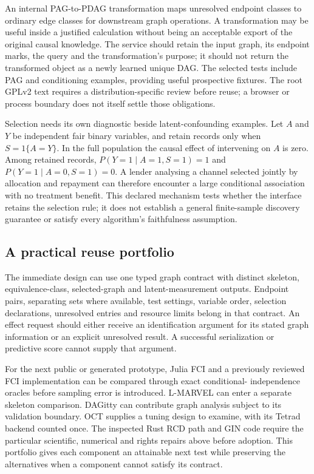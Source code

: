 An internal PAG-to-PDAG transformation maps unresolved endpoint classes
to ordinary edge classes for downstream graph operations. A
transformation may be useful inside a justified calculation without
being an acceptable export of the original causal knowledge. The service
should retain the input graph, its endpoint marks, the query and the
transformation's purpose; it should not return the transformed object as
a newly learned unique DAG. The selected tests include PAG and
conditioning examples, providing useful prospective fixtures. The root
GPLv2 text requires a distribution-specific review before reuse; a
browser or process boundary does not itself settle those obligations.
\citep{exec14_olatent_dagitty}

Selection needs its own diagnostic beside latent-confounding examples.
Let \(A\) and \(Y\) be independent fair binary variables, and retain
records only when \(S=1\{A=Y\}\). In the full population the causal
effect of intervening on \(A\) is zero. Among retained records,
\(P(Y=1\mid A=1,S=1)=1\) and \(P(Y=1\mid A=0,S=1)=0\). A lender
analysing a channel selected jointly by allocation and repayment can
therefore encounter a large conditional association with no treatment
benefit. This declared mechanism tests whether the interface retains the
selection rule; it does not establish a general finite-sample discovery
guarantee or satisfy every algorithm's faithfulness assumption.
\citep{exec14_olatent_oracle}

\hypertarget{a-practical-reuse-portfolio}{%
\subsection{A practical reuse
portfolio}\label{a-practical-reuse-portfolio}}

The immediate design can use one typed graph contract with distinct
skeleton, equivalence-class, selected-graph and latent-measurement
outputs. Endpoint pairs, separating sets where available, test settings,
variable order, selection declarations, unresolved entries and resource
limits belong in that contract. An effect request should either receive
an identification argument for its stated graph information or an
explicit unresolved result. A successful serialization or predictive
score cannot supply that argument.

For the next public or generated prototype, Julia FCI and a previously
reviewed FCI implementation can be compared through exact conditional-
independence oracles before sampling error is introduced. L-MARVEL can
enter a separate skeleton comparison. DAGitty can contribute graph
analysis subject to its validation boundary. OCT supplies a tuning
design to examine, with its Tetrad backend counted once. The inspected
Rust RCD path and GIN code require the particular scientific, numerical
and rights repairs above before adoption. This portfolio gives each
component an attainable next test while preserving the alternatives when
a component cannot satisfy its contract.

